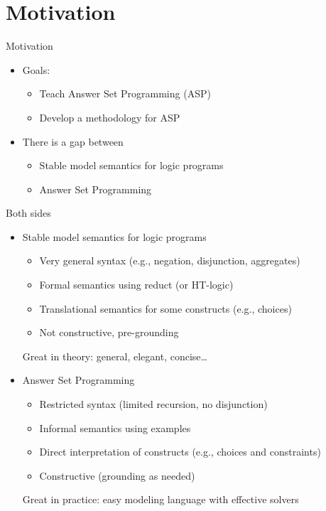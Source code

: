 \section{Motivation}

\begin{frame}{Motivation}
\begin{itemize}
  \vfill
  \item<1->\alert<1>{Goals}:
  \begin{itemize}
    \item Teach Answer Set Programming (ASP)
    \item Develop a methodology for ASP
  \end{itemize}
  \bigskip
  \bigskip
  \item<2->There is a \alert<2>{gap} between
  \begin{itemize}
    \item Stable model semantics for \alert<2>{logic} programs
    \item Answer Set \alert<2>{Programming}
  \end{itemize}
  \vfill
\end{itemize}
\end{frame}

\begin{frame}{Both sides}
\begin{itemize}

  \item<1-> \alert<1>{Stable model semantics} for logic programs
  \begin{itemize}
    \item Very general syntax (e.g., negation, disjunction, aggregates)
    \item \alert<1>{Formal semantics} using reduct (or HT-logic)
    \item Translational semantics for some constructs (e.g., choices)
    \item Not constructive, pre-grounding
  \end{itemize}
  Great in theory: general, elegant, concise\ldots 
  \bigskip\bigskip
  \item<2-> \alert<2>{Answer Set Programming} 
  \begin{itemize}
    \item Restricted syntax (limited recursion, no disjunction)
    \item \alert<2>{Informal semantics} using examples
    \item Direct interpretation of constructs (e.g., choices and constraints)
    \item Constructive (grounding as needed)
  \end{itemize}
  Great in practice: easy modeling language with effective solvers

\end{itemize}
\end{frame}


